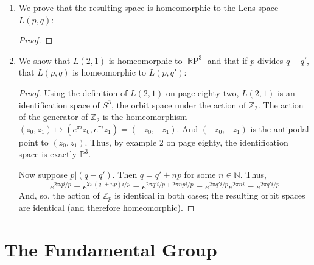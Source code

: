 \documentclass{book}
\DeclareMathOperator*{\R}{\mathbb{R}}
\DeclareMathOperator*{\RP}{\R\text{P}}
\begin{document}
\begin{enumerate}[(1)]
    \item We prove that the resulting space is homeomorphic to the Lens space $L(p,q)$: 
        \begin{proof}
        \end{proof}

    \item We show that $L(2,1)$ is homeomorphic to $\RP^3$ and that if $p$ divides $q-q'$, that $L(p,q)$ is homeomorphic to $L(p,q')$: 
        \begin{proof} Using the definition of $L(2,1)$ on page eighty-two, $L(2,1)$ is an identification space of $S^3$, the orbit space under the action of $\mathbb Z_2$.  The action of the generator of $\mathbb Z_2$ is the homeomorphism $(z_0,z_1)\mapsto(e^{\pi i}z_0,e^{\pi i}z_1)=(-z_0,-z_1)$.  And $(-z_0,-z_1)$ is the antipodal point to $(z_0,z_1)$.  Thus, by example $2$ on page eighty, the identification space is exactly $\mathbb P^3$.
            \par Now suppose $p|(q-q')$.  Then $q=q'+np$ for some $n\in\mathbb N$.  Thus,
            \[e^{2\pi qi/p}=e^{2\pi (q'+np)i/p}=e^{2\pi q'i/p+2\pi npi/p}=e^{2\pi q'i/p}e^{2\pi ni}=e^{2\pi q'i/p}\]
            And, so, the action of $\mathbb Z_p$ is identical in both cases; the resulting orbit spaces are identical (and therefore homeomorphic).
        \end{proof}

\end{enumerate}


\newpage 
\chapter{The Fundamental Group}
\end{document}
